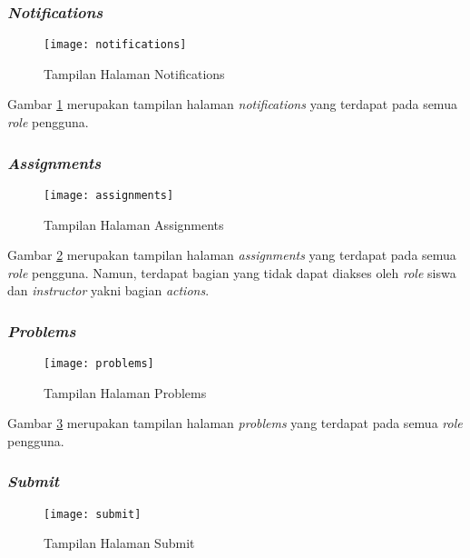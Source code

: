 \subsubsection{\textit{Notifications}}
\begin{figure}[H]
	\centering  
	\texttt{[image: notifications]}  
	\caption[Tampilan Halaman \textit{Notifications}]{Tampilan Halaman Notifications} 
	\label{fig:notifications} 
\end{figure}

Gambar \ref{fig:notifications} merupakan tampilan halaman \textit{notifications} yang terdapat pada semua \textit{role} pengguna.

\subsubsection{\textit{Assignments}}
\begin{figure}[H]
	\centering  
	\texttt{[image: assignments]}  
	\caption[Tampilan Halaman \textit{Assignments}]{Tampilan Halaman Assignments} 
	\label{fig:assignments} 
\end{figure}

Gambar \ref{fig:assignments} merupakan tampilan halaman \textit{assignments} yang terdapat pada semua \textit{role} pengguna. Namun, terdapat bagian yang tidak dapat diakses oleh \textit{role} siswa dan \textit{instructor} yakni bagian \textit{actions}.
\subsubsection{\textit{Problems}}
\begin{figure}[H]
	\centering  
	\texttt{[image: problems]}  
	\caption[Tampilan Halaman \textit{Problems}]{Tampilan Halaman Problems} 
	\label{fig:problems} 
\end{figure}

Gambar \ref{fig:problems} merupakan tampilan halaman \textit{problems} yang terdapat pada semua \textit{role} pengguna.

\subsubsection{\textit{Submit}}
\begin{figure}[H]
	\centering  
	\texttt{[image: submit]}  
	\caption[Tampilan Halaman \textit{Submit}]{Tampilan Halaman Submit} 
	\label{fig:submit} 
\end{figure}

